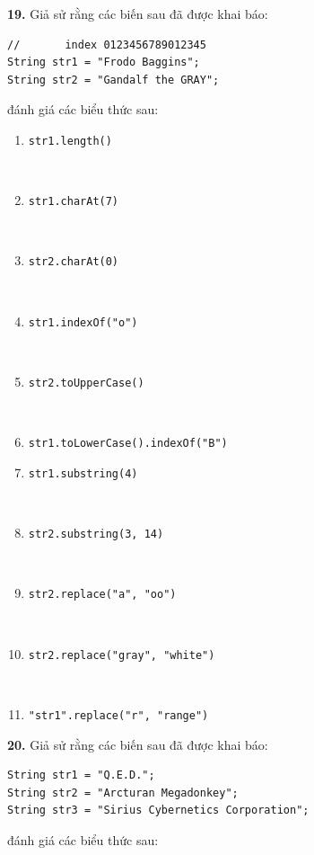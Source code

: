 \textbf{19.} Giả sử rằng các biến sau đã được khai báo:

\begin{verbatim}
//       index 0123456789012345
String str1 = "Frodo Baggins";
String str2 = "Gandalf the GRAY";
\end{verbatim}

đánh giá các biểu thức sau:

\begin{enumerate}
\def\labelenumi{\alph{enumi}.}
\item
  \texttt{str1.length()}\strut \\
\item
  \texttt{str1.charAt(7)}\strut \\
\item
  \texttt{str2.charAt(0)}\strut \\
\item
  \texttt{str1.indexOf("o")}\strut \\
\item
  \texttt{str2.toUpperCase()}\strut \\
\item
  \texttt{str1.toLowerCase().indexOf("B")}
\item
  \texttt{str1.substring(4)}\strut \\
\item
  \texttt{str2.substring(3,\ 14)}\strut \\
\item
  \texttt{str2.replace("a",\ "oo")}\strut \\
\item
  \texttt{str2.replace("gray",\ "white")}\strut \\
\item
  \texttt{"str1".replace("r",\ "range")}
\end{enumerate}

\textbf{20.} Giả sử rằng các biến sau đã được khai báo:

\begin{verbatim}
String str1 = "Q.E.D.";
String str2 = "Arcturan Megadonkey";
String str3 = "Sirius Cybernetics Corporation";
\end{verbatim}

đánh giá các biểu thức sau:

